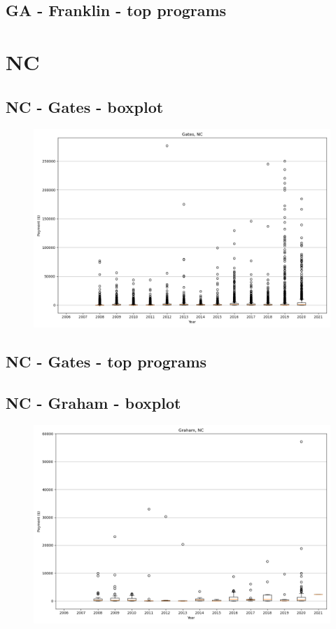 \subsection*{GA - Franklin - top programs}

\newpage
\section*{NC}
\subsection*{NC - Gates - boxplot}
\begin{figure}[h]
\centering
\includegraphics[width=7in]{../output/boxplots/counties/Gates-NC_boxplot.png}
\end{figure}


\subsection*{NC - Gates - top programs}

\newpage
\subsection*{NC - Graham - boxplot}
\begin{figure}[h]
\centering
\includegraphics[width=7in]{../output/boxplots/counties/Graham-NC_boxplot.png}
\end{figure}


